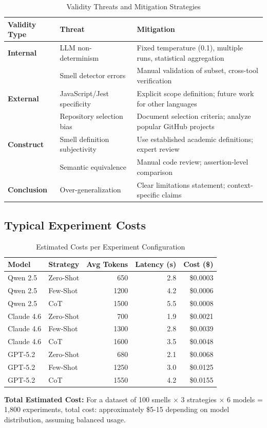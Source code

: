 \begin{table}[h]
\centering
\caption{Validity Threats and Mitigation Strategies}
\label{tab:validity-threats}
\footnotesize
\begin{tabular}{@{}p{2.5cm}p{5cm}p{5cm}@{}}
\toprule
\textbf{Validity Type} & \textbf{Threat} & \textbf{Mitigation} \\ \midrule
\textbf{Internal} & 
  LLM non-determinism & 
  Fixed temperature (0.1), multiple runs, statistical aggregation \\
 & Smell detector errors & 
  Manual validation of subset, cross-tool verification \\
\addlinespace
\textbf{External} & 
  JavaScript/Jest specificity & 
  Explicit scope definition; future work for other languages \\
 & Repository selection bias & 
  Document selection criteria; analyze popular GitHub projects \\
\addlinespace
\textbf{Construct} & 
  Smell definition subjectivity & 
  Use established academic definitions; expert review \\
 & Semantic equivalence & 
  Manual code review; assertion-level comparison \\
\addlinespace
\textbf{Conclusion} & 
  Over-generalization & 
  Clear limitations statement; context-specific claims \\ \bottomrule
\end{tabular}
\end{table}

\subsection{Typical Experiment Costs}

\begin{table}[h]
\centering
\caption{Estimated Costs per Experiment Configuration}
\label{tab:costs}
\small
\begin{tabular}{@{}llrrr@{}}
\toprule
\textbf{Model} & \textbf{Strategy} & \textbf{Avg Tokens} & \textbf{Latency (s)} & \textbf{Cost (\$)} \\ \midrule
Qwen 2.5 & Zero-Shot & 650 & 2.8 & \$0.0003 \\
Qwen 2.5 & Few-Shot & 1200 & 4.2 & \$0.0006 \\
Qwen 2.5 & CoT & 1500 & 5.5 & \$0.0008 \\
\addlinespace
Claude 4.6 & Zero-Shot & 700 & 1.9 & \$0.0021 \\
Claude 4.6 & Few-Shot & 1300 & 2.8 & \$0.0039 \\
Claude 4.6 & CoT & 1600 & 3.5 & \$0.0048 \\
\addlinespace
GPT-5.2 & Zero-Shot & 680 & 2.1 & \$0.0068 \\
GPT-5.2 & Few-Shot & 1250 & 3.0 & \$0.0125 \\
GPT-5.2 & CoT & 1550 & 4.2 & \$0.0155 \\ \bottomrule
\end{tabular}
\end{table}

\textbf{Total Estimated Cost:} For a dataset of 100 smells × 3 strategies × 6 models = 1,800 experiments, total cost: approximately \$5-15 depending on model distribution, assuming balanced usage.


